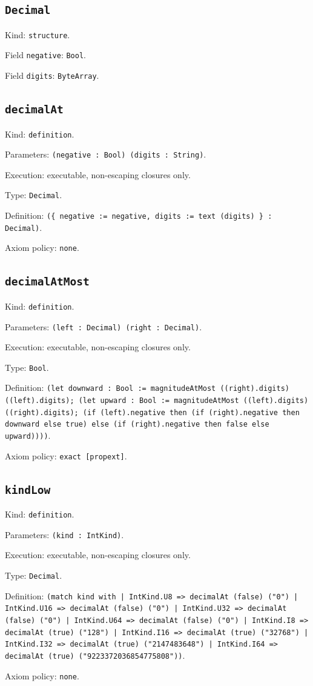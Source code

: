 \documentclass[11pt]{article}
\begin{document}
\subsection*{\texttt{Decimal}}
\noindent Kind: \texttt{structure}.\par
\noindent Field \texttt{negative}: \texttt{Bool}.\par
\noindent Field \texttt{digits}: \texttt{ByteArray}.\par
\subsection*{\texttt{decimalAt}}
\noindent Kind: \texttt{definition}.\par
\noindent Parameters: \texttt{(negative : Bool) (digits : String)}.\par
\noindent Execution: executable, non-escaping closures only.\par
\noindent Type: \texttt{Decimal}.\par
\noindent Definition: \texttt{(\{ negative := negative, digits := text (digits) \} : Decimal)}.\par
\noindent Axiom policy: \texttt{none}.\par
\subsection*{\texttt{decimalAtMost}}
\noindent Kind: \texttt{definition}.\par
\noindent Parameters: \texttt{(left : Decimal) (right : Decimal)}.\par
\noindent Execution: executable, non-escaping closures only.\par
\noindent Type: \texttt{Bool}.\par
\noindent Definition: \texttt{(let downward : Bool := magnitudeAtMost ((right).digits) ((left).digits); (let upward : Bool := magnitudeAtMost ((left).digits) ((right).digits); (if (left).negative then (if (right).negative then downward else true) else (if (right).negative then false else upward))))}.\par
\noindent Axiom policy: \texttt{exact [propext]}.\par
\subsection*{\texttt{kindLow}}
\noindent Kind: \texttt{definition}.\par
\noindent Parameters: \texttt{(kind : IntKind)}.\par
\noindent Execution: executable, non-escaping closures only.\par
\noindent Type: \texttt{Decimal}.\par
\noindent Definition: \texttt{(match kind with | IntKind.U8 => decimalAt (false) ("0") | IntKind.U16 => decimalAt (false) ("0") | IntKind.U32 => decimalAt (false) ("0") | IntKind.U64 => decimalAt (false) ("0") | IntKind.I8 => decimalAt (true) ("128") | IntKind.I16 => decimalAt (true) ("32768") | IntKind.I32 => decimalAt (true) ("2147483648") | IntKind.I64 => decimalAt (true) ("9223372036854775808"))}.\par
\noindent Axiom policy: \texttt{none}.\par
\end{document}
